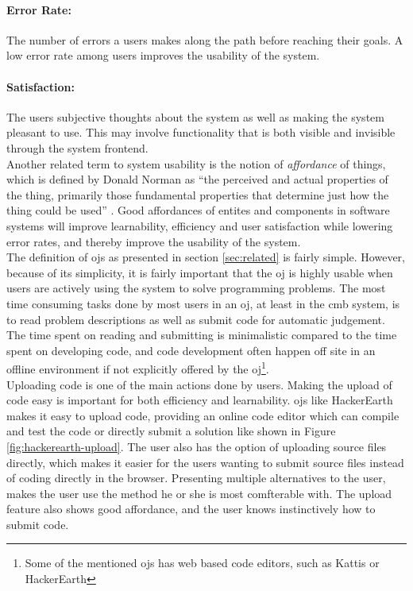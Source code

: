 \paragraph*{Error Rate:} The number of errors a users makes along the path before reaching their goals. A low error rate among users improves the usability of the system.

\paragraph*{Satisfaction:} The users subjective thoughts about the system as well as making the system pleasant to use. This may involve functionality that is both visible and invisible through the system frontend. \\

Another related term to system usability is the notion of \textit{affordance} of things, which is defined by Donald Norman as ``the perceived and actual properties of the thing, primarily those fundamental properties that determine just how the thing could be used'' \cite{norman1988design}. Good affordances of entites and components in software systems will improve learnability, efficiency and user satisfaction while lowering error rates, and thereby improve the usability of the system. \\

The definition of \gls{ojs} as presented in section \ref{sec:related} is fairly simple. However, because of its simplicity, it is fairly important that the \gls{oj} is highly usable when users are actively using the system to solve programming problems. The most time consuming tasks done by most users in an \gls{oj}, at least in the \gls{cmb} system, is to read problem descriptions as well as submit code for automatic judgement. The time spent on reading and submitting is minimalistic compared to the time spent on developing code, and code development often happen off site in an offline environment if not explicitly offered by the \gls{oj}\footnote{Some of the mentioned \gls{ojs} has web based code editors, such as Kattis \cite{KATTIS} or HackerEarth\cite{HACKEREARTH}}. \\

Uploading code is one of the main actions done by users. Making the upload of code easy is important for both efficiency and learnability. \gls{ojs} like HackerEarth makes it easy to upload code, providing an online code editor which can compile and test the code or directly submit a solution like shown in Figure \ref{fig:hackerearth-upload}. The user also has the option of uploading source files directly, which makes it easier for the users wanting to submit source files instead of coding directly in the browser. Presenting multiple alternatives to the user, makes the user use the method he or she is most comfterable with. The upload feature also shows good affordance, and the user knows instinctively how to submit code. \\

